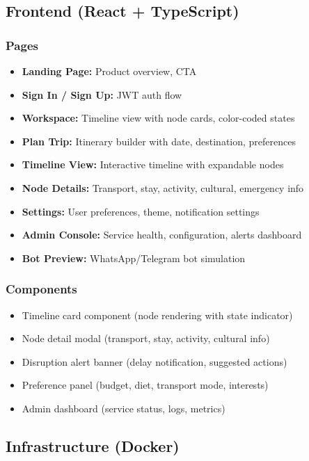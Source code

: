 \documentclass[11pt]{article}
\begin{document}
\subsection{Frontend (React + TypeScript)}

\subsubsection{Pages}

\begin{itemize}
    \item \textbf{Landing Page:} Product overview, CTA
    \item \textbf{Sign In / Sign Up:} JWT auth flow
    \item \textbf{Workspace:} Timeline view with node cards, color-coded states
    \item \textbf{Plan Trip:} Itinerary builder with date, destination, preferences
    \item \textbf{Timeline View:} Interactive timeline with expandable nodes
    \item \textbf{Node Details:} Transport, stay, activity, cultural, emergency info
    \item \textbf{Settings:} User preferences, theme, notification settings
    \item \textbf{Admin Console:} Service health, configuration, alerts dashboard
    \item \textbf{Bot Preview:} WhatsApp/Telegram bot simulation
\end{itemize}

\subsubsection{Components}

\begin{itemize}
    \item Timeline card component (node rendering with state indicator)
    \item Node detail modal (transport, stay, activity, cultural info)
    \item Disruption alert banner (delay notification, suggested actions)
    \item Preference panel (budget, diet, transport mode, interests)
    \item Admin dashboard (service status, logs, metrics)
\end{itemize}

\subsection{Infrastructure (Docker)}
\end{document}
